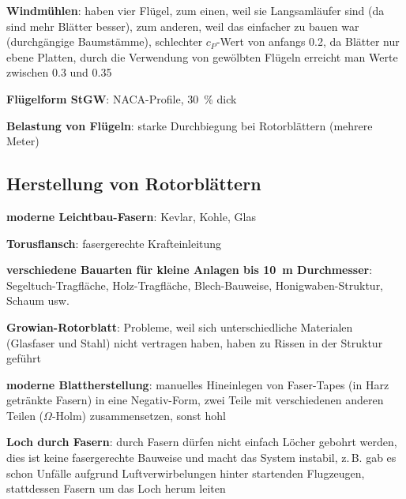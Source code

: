 \textbf{Windmühlen}:
haben vier Flügel, zum einen, weil sie Langsamläufer sind (da sind mehr Blätter besser),
zum anderen, weil das einfacher zu bauen war (durchgängige Baumstämme),
schlechter $c_P$-Wert von anfangs \num{0.2}, da Blätter nur ebene Platten,
durch die Verwendung von gewölbten Flügeln erreicht man Werte zwischen \num{0.3} und \num{0.35}

\textbf{Flügelform StGW}:
NACA-Profile, \SI{30}{\percent} dick

\textbf{Belastung von Flügeln}:
starke Durchbiegung bei Rotorblättern (mehrere Meter)

\pagebreak

\subsection{%
    Herstellung von Rotorblättern%
}

\textbf{moderne Leichtbau-Fasern}:
Kevlar, Kohle, Glas

\textbf{Torusflansch}: fasergerechte Krafteinleitung

\textbf{verschiedene Bauarten für kleine Anlagen bis \SI{10}{\meter} Durchmesser}:\\
Segeltuch-Tragfläche,
Holz-Tragfläche,
Blech-Bauweise,
Honigwaben-Struktur,
Schaum usw.

\textbf{Growian-Rotorblatt}:
Probleme, weil sich unterschiedliche Materialen (Glasfaser und Stahl) nicht vertragen haben,
haben zu Rissen in der Struktur geführt

\textbf{moderne Blattherstellung}:
manuelles Hineinlegen von Faser-Tapes (in Harz getränkte Fasern) in eine Negativ-Form,
zwei Teile mit verschiedenen anderen Teilen ($\Omega$-Holm) zusammensetzen, sonst hohl

\textbf{Loch durch Fasern}:
durch Fasern dürfen nicht einfach Löcher gebohrt werden,
dies ist keine fasergerechte Bauweise und macht das System instabil,
z.\,B. gab es schon Unfälle aufgrund Luftverwirbelungen hinter startenden Flugzeugen,
stattdessen Fasern um das Loch herum leiten

\pagebreak
